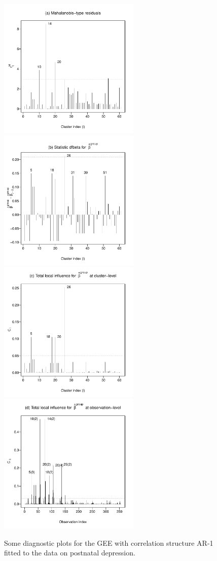 \begin{figure}[h!]
\centering
\includegraphics[width=6.75cm]{depression3a}
\includegraphics[width=6.75cm]{depression3b}\\
\includegraphics[width=6.75cm]{depression3c}
\includegraphics[width=6.75cm]{depression3d}
\caption{Some diagnostic plots for the GEE with correlation structure AR-1 fitted to the data on postnatal depression.}
\label{depression}
\end{figure}


